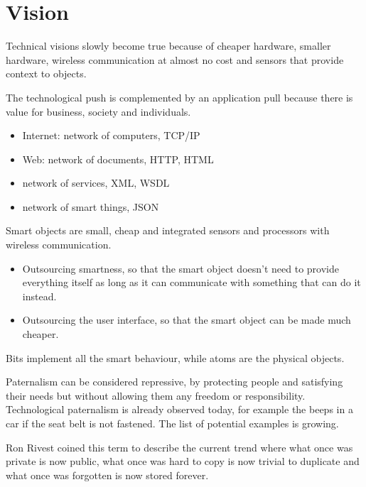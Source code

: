 \section{Vision}
\begin{myremark}Technical visions slowly become true because of cheaper hardware, smaller hardware, wireless communication at almost no cost and sensors that provide context to objects.
\end{myremark}

\begin{mytitle} The technological push is complemented by an application pull because there is value for business, society and individuals.
\end{mytitle}
\begin{mytitle}\hfill
\begin{itemize}
    \item Internet: network of computers, TCP/IP
    \item Web: network of documents, HTTP, HTML
    \item network of services, XML, WSDL
    \item network of smart things, JSON
\end{itemize}
\end{mytitle}
\begin{mytitle} Smart objects are small, cheap and integrated sensors and processors with wireless communication.
\end{mytitle}
\begin{mytitle}\hfill
\begin{itemize}
    \item Outsourcing smartness, so that the smart object doesn't need to provide everything itself as long as it can communicate with something that can do it instead.
    \item Outsourcing the user interface, so that the smart object can be made much cheaper.
\end{itemize}
\end{mytitle}
\begin{mytitle} Bits implement all the smart behaviour, while atoms are the physical objects.
\end{mytitle}
\begin{mytitle} Paternalism can be considered repressive, by protecting people and satisfying their needs but without allowing them any freedom or responsibility. Technological paternalism is already observed today, for example the beeps in a car if the seat belt is not fastened. The list of potential examples is growing.
\end{mytitle}
\begin{mytitle} Ron Rivest coined this term to describe the current trend where what once was private is now public, what once was hard to copy is now trivial to duplicate and what once was forgotten is now stored forever.
\end{mytitle}
